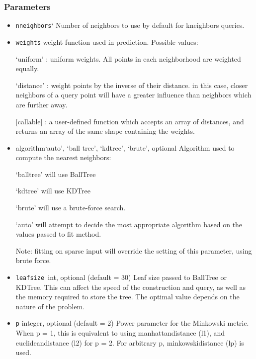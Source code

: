 \documentclass[12pt]{article}
\begin{document}
\subsubsection{Parameters}
\begin{itemize}
\item \texttt{n\textunderscore neighbors}`
Number of neighbors to use by default for kneighbors queries.

\item
\texttt{weights}
weight function used in prediction. Possible values:

‘uniform’ : uniform weights. All points in each neighborhood are weighted equally.

‘distance’ : weight points by the inverse of their distance. in this case, closer neighbors of a query point will have a greater influence than neighbors which are further away.

[callable] : a user-defined function which accepts an array of distances, and returns an array of the same shape containing the weights.

\item{algorithm}{‘auto’, ‘ball \textunderscore tree’, ‘kd\textunderscore tree’, ‘brute’}, optional
Algorithm used to compute the nearest neighbors:

‘ball\textunderscore tree’ will use BallTree

‘kd\textunderscore tree’ will use KDTree

‘brute’ will use a brute-force search.

‘auto’ will attempt to decide the most appropriate algorithm based on the values passed to fit method.

Note: fitting on sparse input will override the setting of this parameter, using brute force.

\item \texttt{leaf\textunderscore size }int, optional (default = 30)
Leaf size passed to BallTree or KDTree. This can affect the speed of the construction and query, as well as the memory required to store the tree. The optimal value depends on the nature of the problem.

\item \texttt{p} integer, optional (default = 2)
Power parameter for the Minkowski metric. When p = 1, this is equivalent to using manhattan\textunderscore distance (l1), and euclidean\textunderscore distance (l2) for p = 2. For arbitrary p, minkowski\textunderscore distance (l\textunderscore p) is used.


\end{itemize}
\end{document}
